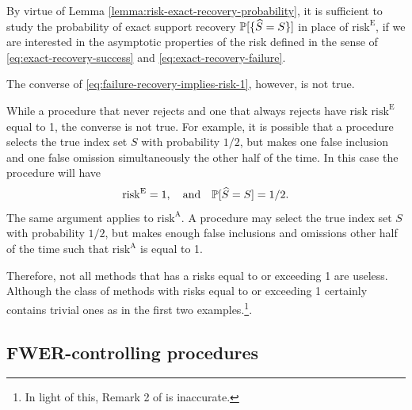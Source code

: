 \begin{remark}
By virtue of Lemma \ref{lemma:risk-exact-recovery-probability}, it is sufficient to study the probability of exact support recovery $\P[\{\widehat{S}=S\}]$ in place of $\mathrm{risk}^{\mathrm{E}}$, if we are interested in the asymptotic properties of the risk defined in the sense of \eqref{eq:exact-recovery-success} and \eqref{eq:exact-recovery-failure}.
\end{remark}

The converse of \eqref{eq:failure-recovery-implies-risk-1}, however, is not true.

\begin{remark} \label{rmk:asymptotic-risks}
While a procedure that never rejects and one that always rejects have risk $\mathrm{risk}^{\mathrm{E}}$ equal to 1, the converse is not true.
For example, it is possible that a procedure selects the true index set $S$ with probability $1/2$, but makes one false inclusion and one false omission simultaneously the other half of the time. 
In this case the procedure will have 
$$\mathrm{risk}^{\mathrm{E}} = 1, \quad \text{and} \quad \P[\widehat{S}=S] = 1/2.$$
The same argument applies to $\mathrm{risk}^{\mathrm{A}}$. 
A procedure may select the true index set $S$ with probability $1/2$, but makes enough false inclusions and omissions other half of the time such that $\mathrm{risk}^{\mathrm{A}}$ is equal to 1. 

Therefore, not all methods that has a risks equal to or exceeding 1 are useless. 
Although the class of methods with risks equal to or exceeding 1 certainly contains trivial ones as in the first two examples.\footnote{In light of this, Remark 2 of \citet*{arias2017distribution} is inaccurate.}.
\end{remark}


\subsection{FWER-controlling procedures}
\label{subsec:FWER-controlling-procedures}

